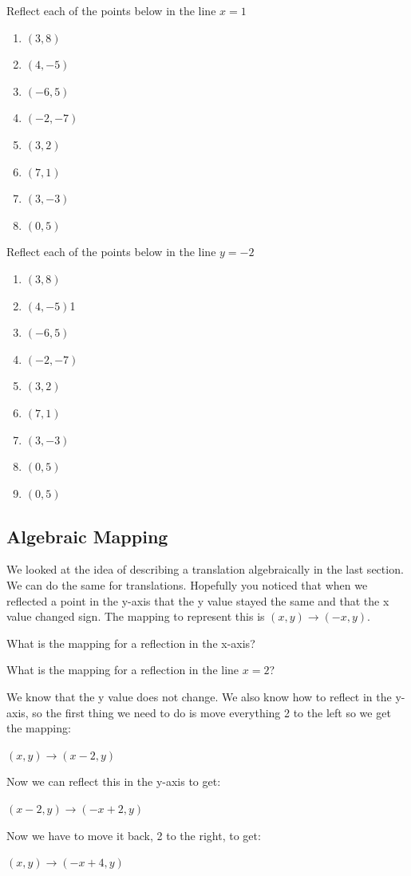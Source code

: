 	\bigskip

	Reflect each of the points below in the line $x = 1$
		\begin{enumerate}
			\item $(3, 8)$
			\item $(4, -5)$
			\item $(-6, 5)$
			\item $(-2, -7)$
			\item $(3, 2)$
			\item $(7, 1)$
			\item $(3, -3)$
			\item $(0, 5)$
		\end{enumerate}
		Reflect each of the points below in the line $y=-2$
			\begin{enumerate}
				\item $(3, 8)$
				\item $(4, -5)$1
				\item $(-6, 5)$
				\item $(-2, -7)$
				\item $(3, 2)$
				\item $(7, 1)$
				\item $(3, -3)$
				\item $(0, 5)$
				\item $(0, 5)$
			\end{enumerate}
	\subsection{Algebraic Mapping}
	We looked at the idea of describing a translation algebraically in the last section.  We can do the same for translations.  Hopefully you noticed that when we reflected a point in the y-axis that the y value stayed the same and that the x value changed sign.  The mapping to represent this is $(x, y) \rightarrow (-x, y)$.

	\bigskip

	What is the mapping for a reflection in the x-axis?

	\begin{exmp}
		What is the mapping for a reflection in the line $x = 2$?

		\bigskip

		We know that the y value does not change.  We also know how to reflect in the y-axis, so the first thing we need to do is move everything 2 to the left so we get the mapping:

		\bigskip

		$(x,y) \rightarrow (x-2, y)$

		\bigskip

		Now we can reflect this in the y-axis to get:

		\bigskip

		$(x-2,y) \rightarrow (-x+2, y)$

		\bigskip

		Now we have to move it back, 2 to the right, to get:

		$(x, y) \rightarrow (-x + 4, y)$
	\end{exmp}


